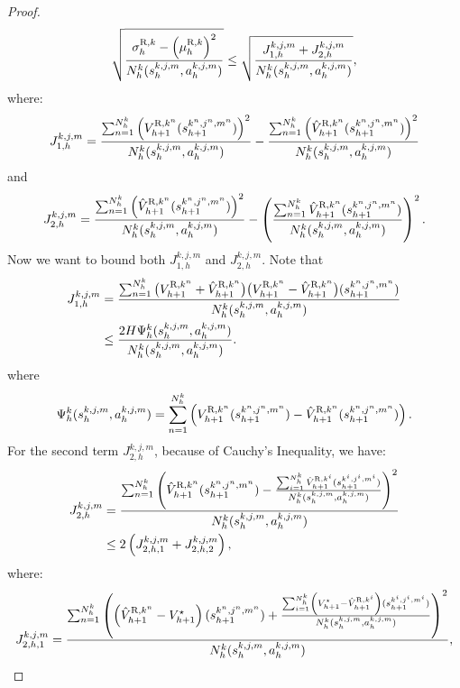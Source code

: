 \documentclass{article}
\newcommand{\R}{\textnormal{R}}
\begin{document}
\begin{proof}
\begin{align}
\label{refestimate}
 \sqrt{\frac{\sigma_h^{\R,k} - \left(\mu_h^{\R,k}\right)^2}{N_h^k(s_h^{k,j,m}, a_h^{k,j,m})}} \leq \sqrt{\frac{J_{1,h}^{k,j,m}+J_{2,h}^{k,j,m}}{N_h^k(s_h^{k,j,m}, a_h^{k,j,m})}},
\end{align}
where:
\begin{equation*}
    \label{j1hk}
    J_{1,h}^{k,j,m} = \frac{\sum_{n=1}^{N_h^k}\left(V_{h+1}^{\R,k^n}(s_{h+1}^{k^n,j^n,m^n})\right)^2}{N_h^k(s_h^{k,j,m}, a_h^{k,j,m})}- \frac{\sum_{n=1}^{N_h^k}\left(\hat{V}_{h+1}^{\R,k^n}(s_{h+1}^{k^n,j^n,m^n})\right)^2}{N_h^k(s_h^{k,j,m}, a_h^{k,j,m})}
\end{equation*}
and
\begin{equation*}
    \label{j2hk}
    J_{2,h}^{k,j,m} = \frac{\sum_{n=1}^{N_h^k}\left(\hat{V}_{h+1}^{\R,k^n}(s_{h+1}^{k^n,j^n,m^n})\right)^2}{N_h^k(s_h^{k,j,m}, a_h^{k,j,m})}-\left(\frac{\sum_{n=1}^{N_h^k}\hat{V}_{h+1}^{\R,k^n}(s_{h+1}^{k^n,j^n,m^n})}{N_h^k(s_h^{k,j,m}, a_h^{k,j,m})}\right)^2.
\end{equation*}
Now we want to bound both $J_{1,h}^{k,j,m}$ and $J_{2,h}^{k,j,m}$. Note that
\begin{align}
\label{j1upper}
    J_{1,h}^{k,j,m}
    &= \frac{\sum_{n=1}^{N_h^k}\big(V_{h+1}^{\R,k^n}+\hat{V}_{h+1}^{\R,k^n}\big) \big(V_{h+1}^{\R,k^n}-\hat{V}_{h+1}^{\R,k^n}\big)(s_{h+1}^{k^n,j^n,m^n})}{N_h^k(s_h^{k,j,m}, a_h^{k,j,m})}
    \nonumber\\
    &\leq \frac{2H\Psi_h^k(s_h^{k,j,m}, a_h^{k,j,m})}{N_h^k(s_h^{k,j,m}, a_h^{k,j,m})}.
\end{align}
where
\begin{equation}
\label{defpsi}
   \Psi_h^k(s_h^{k,j,m}, a_h^{k,j,m}) = \sum_{n=1}^{N_h^k} \left(V_{h+1}^{\R,k^n}(s_{h+1}^{k^n,j^n,m^n})-\hat{V}_{h+1}^{\R,k^n}(s_{h+1}^{k^n,j^n,m^n})\right).
\end{equation}
For the second term $J_{2,h}^{k,j,m}$, because of Cauchy's Inequality, we have:
\begin{align*}   
    J_{2,h}^{k,j,m} &= \frac{\sum_{n=1}^{N_h^k}\left(\hat{V}_{h+1}^{\R,k^n}(s_{h+1}^{k^n,j^n,m^n})-\frac{\sum_{i=1}^{N_h^k}\hat{V}_{h+1}^{\R,k^i}(s_{h+1}^{k^i,j^i,m^i})}{N_h^k(s_h^{k,j,m}, a_h^{k,j,m})}\right)^2}{N_h^k(s_h^{k,j,m}, a_h^{k,j,m})} \\
    &\leq 2\left(J_{2,h,1}^{k,j,m} + J_{2,h,2}^{k,j,m}\right),
\end{align*}
where:
$$J_{2,h,1}^{k,j,m} = \frac{\sum_{n=1}^{N_h^k}\left(\left(\hat{V}_{h+1}^{\R,k^n}-V_{h+1}^{\star}\right)(s_{h+1}^{k^n,j^n,m^n})+\frac{\sum_{i=1}^{N_h^k}\left(V_{h+1}^{\star}-\hat{V}_{h+1}^{\R,k^i}\right)(s_{h+1}^{k^i,j^i,m^i})}{N_h^k(s_h^{k,j,m}, a_h^{k,j,m})}\right)^2}{N_h^k(s_h^{k,j,m}, a_h^{k,j,m})},$$

\end{proof}
\end{document}
